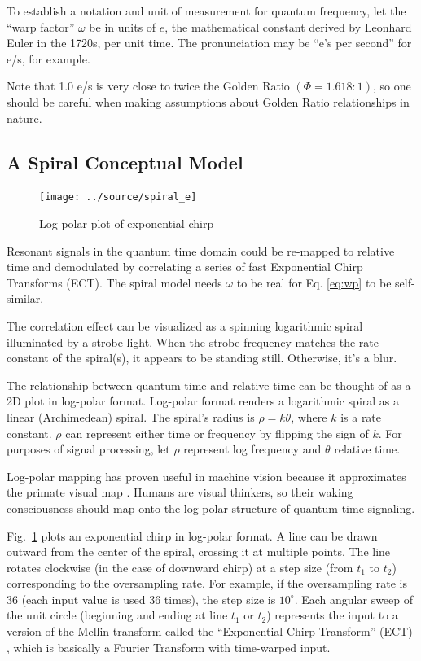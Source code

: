To establish a notation and unit of measurement for quantum frequency,
let the ``warp factor'' $\omega$ be in units of $e$, the
mathematical constant derived by Leonhard Euler in the 1720s, per unit time.
The pronunciation may be ``e's per second'' for e/s, for example.

Note that 1.0 e/s is very close to twice the Golden Ratio $(\Phi=1.618:1)$,
so one should be careful when making assumptions about Golden Ratio relationships
in nature.

\subsection{A Spiral Conceptual Model}

\begin{figure}[h]
    \centering
    \texttt{[image: ../source/spiral\_e]}
    \caption[Quantum to Relative Time Relation]{Log polar plot of exponential chirp}
    \label{fig:spiral}
\end{figure}

Resonant signals in the quantum time domain could be re-mapped to relative time
and demodulated by correlating a series of fast Exponential Chirp Transforms (ECT). 
The spiral model needs $\omega$ to be real for Eq. \ref{eq:wp} to be self-similar.

The correlation effect can be visualized as a spinning logarithmic spiral
illuminated by a strobe light. When the strobe frequency matches the rate
constant of the spiral(s), it appears to be standing still.
Otherwise, it's a blur.

The relationship between quantum time and relative time can be thought of as a
2D plot in log-polar format.
Log-polar format renders a logarithmic spiral as a linear (Archimedean) spiral.
The spiral's radius is $\rho = k\theta$, where $k$ is a rate constant.
$\rho$ can represent either time or frequency by flipping the sign of $k$.
For purposes of signal processing, let $\rho$ represent log frequency and
$\theta$ relative time.

Log-polar mapping has proven useful in machine vision \cite{Bonmassar}
because it approximates the primate visual map \cite{Schwartz}.
Humans are visual thinkers, so their waking consciousness should map onto the
log-polar structure of quantum time signaling.

Fig.~\ref{fig:spiral} plots an exponential chirp in log-polar format.
A line can be drawn outward from the center of the spiral, crossing it at
multiple points.
The line rotates clockwise (in the case of downward chirp) at a step size
(from $t_1$ to $t_2$) corresponding to the oversampling rate.
For example, if the oversampling rate is 36 (each input value is used 36 times),
the step size is $10^{\circ}$.
Each angular sweep of the unit circle
(beginning and ending at line $t_1$ or $t_2$)
represents the input to a version of the Mellin transform called the
``Exponential Chirp Transform'' (ECT) \cite{Bonmassar}, which is
basically a Fourier Transform with time-warped input.

